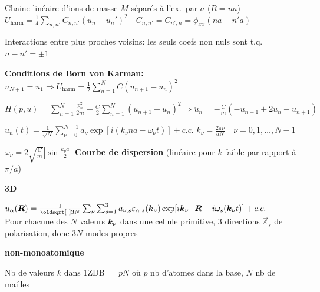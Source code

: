 \begin{squishlist}
    \item Chaine linéaire d'ions de masse $M$ séparés à l'ex.\ par $a$ ($R = na$)\\
    $U_{\text{harm}} = \frac{1}{4} \sum_{n,n'} C_{n,n'}(u_n - u_n')^2 \quad C_{n,n'} = C_{n',n} = \phi_{xx}(na - n'a)$
    \item Interactions entre plus proches voisins: les seuls coefs non nuls sont t.q.\ $n-n'= \pm 1$
    \item \textbf{Conditions de Born von Karman:} $u_{N+1} = u_1 \Longrightarrow U_{\text{harm}} = \frac{1}{2}\sum_{n=1}^{N}C(u_{n+1}-u_n)^2$
    \item $H(p,u) = \sum_{n=1}^{N}\frac{p^2_n}{2m} + \frac{C}{2}\sum_{n=1}^{N}(u_{n+1} - u_n)^2 \Longrightarrow \ddot{u}_n = -\frac{C}{m}(-u_{n-1}+2u_n - u_{n+1})$
    \item $u_n(t) = \frac{1}{\sqrt{N}} \sum_{\nu=0}^{N-1}a_{\nu} \exp[ i (k_{\nu}na - \omega_{\nu}t)] + c.c.$ \quad $k_{\nu} = \frac{2\pi \nu}{aN} \quad \nu = 0,1,\ldots, N-1$ 
    \item $\omega_{\nu} = 2 \sqrt{\frac{C}{m}} \left| \sin \frac{k_{\nu}a}{2}\right|$ \textbf{Courbe de dispersion} (linéaire pour $k$ faible par rapport à $\pi/a$)

    \squishline

    \textbf{3D}
    \item $u_{\alpha}(\vR) = \frac{1}{\sqrt{3N}}\sum_{\nu}\sum_{s=1}^{3} a_{\nu,s} \varepsilon_{\alpha,s}(\vk_{\nu}) \exp [i \vk_{\nu} \cdot \vR - i \omega_s(\vk_{\nu}t)] + c.c.$ \\ 
    Pour chacune des $N$ valeurs $\bm{k}_{\nu}$ dans une cellule primitive, 3 directions $\vec{\varepsilon}_s$ de polarisation, donc $3N$ modes propres

    \squishline

    \textbf{non-monoatomique}
    \item Nb de valeurs $k$ dans 1ZDB $= pN$ où $p$ nb d'atomes dans la base, $N$ nb de mailles

\end{squishlist}

